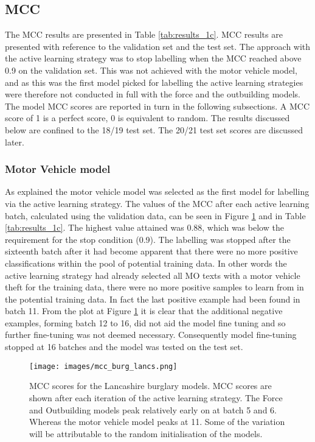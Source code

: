 \subsection{MCC} The MCC results are presented in Table \ref{tab:results_1c}. MCC results are presented with reference to the validation set and the test set. The approach with the active learning strategy was to stop labelling when the MCC reached above 0.9 on the validation set. This was not achieved with the motor vehicle model, and as this was the first model picked for labelling the active learning strategies were therefore not conducted in full with the force and the outbuilding models. The model MCC scores are reported in turn in the following subsections. A MCC score of 1 is a perfect score, 0 is equivalent to random. The results discussed below are confined to the 18/19 test set. The 20/21 test set scores are discussed later.  

\subsubsection{Motor Vehicle model} As explained the motor vehicle model was selected as the first model for labelling via the active learning strategy. The values of the MCC after each active learning batch, calculated using the validation data, can be seen in Figure \ref{fig:mcc_burg_lancs} and in Table \ref{tab:results_1c}. The highest value attained was 0.88, which was below the requirement for the stop condition (0.9). The labelling was stopped after the sixteenth batch after it had become apparent that there were no more positive classifications within the pool of potential training data. In other words the active learning strategy had already selected all MO texts with a motor vehicle theft for the training data, there were no more positive samples to learn from in the potential training data. In fact the last positive example had been found in batch 11. From the plot at Figure \ref{fig:mcc_burg_lancs} it is clear that the additional negative examples, forming batch 12 to 16, did not aid the model fine tuning and so further fine-tuning was not deemed necessary. Consequently model fine-tuning stopped at 16 batches and the model was tested on the test set.

\begin{figure}[!tbp]
  \centering
    \texttt{[image: images/mcc\_burg\_lancs.png]}
    \caption[MCC scores for the Lancashire burglary models.]{{MCC scores for the Lancashire burglary models.} MCC scores are shown after each iteration of the active learning strategy. The Force and Outbuilding models peak relatively early on at batch 5 and 6. Whereas the motor vehicle model peaks at 11. Some of the variation will be attributable to the random initialisation of the models.}
    \label{fig:mcc_burg_lancs}
\end{figure}


